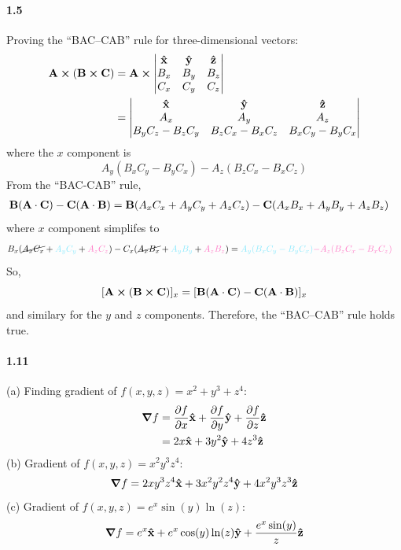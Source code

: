 \documentclass[../main.tex]{subfiles}
\begin{document}
\pagestyle{fancy}

\paragraph{1.5}
Proving the ``BAC--CAB'' rule for three-dimensional vectors:
\begin{align*}
    \vb{A} \cp (\vb{B} \cp \vb{C}) &= \vb{A} \cp
    \begin{vmatrix}
        \vu{x} & \vu{y} & \vu{z} \\
        B_x & B_y & B_z \\
        C_x & C_y & C_z
    \end{vmatrix} \\
    &= \begin{vmatrix}
        \vu{x} & \vu{y} & \vu{z} \\
        A_x & A_y & A_z \\
        B_y C_z - B_z C_y & B_z C_x - B_x C_z & B_x C_y - B_y C_x
    \end{vmatrix}
\end{align*}
where the $x$ component is 
\[A_y (B_x C_y - B_y C_x) - A_z (B_z C_x - B_x C_z)\]
From the ``BAC-CAB'' rule,
\begin{align*}
    \vb{B}(\vb{A} \cdot \vb{C}) - \vb{C}(\vb{A} \cdot \vb{B}) &=
        \vb{B} (A_x C_x + A_y C_y + A_z C_z) - \vb{C} (A_x B_x + A_y B_y + A_z B_z)
\end{align*}
where $x$ component simplifes to
\begin{align*}
    B_x (\cancel{A_x C_x} + \textcolor{draculacyan}{A_y C_y} + \textcolor{draculapink}{A_z C_z}) 
        - C_x (\cancel{A_x B_x}+ \textcolor{draculacyan}{A_y B_y} + \textcolor{draculapink}{A_z B_z}) &=
        \textcolor{draculacyan}{A_y (B_x C_y - B_y C_x)} \textcolor{draculapink}{- A_z (B_z C_x - B_x C_z)}
\end{align*}
So,
\[[\vb A \cross (\vb B \cross \vb C)]_x = [\vb B(\vb A \cdot \vb C) - \vb C ( \vb A \cdot \vb B)]_x\]
and similary for the $y$ and $z$ components. Therefore, the ``BAC--CAB'' rule holds true.

\newpage
\paragraph{1.11}
(a) Finding gradient of $f(x, y, z) = x^2 + y^3 + z^4$:
\begin{align*}
    \grad{f} &= \pdv{f}{x} \vu{x} + \pdv{f}{y} \vu{y} + \pdv{f}{z} \vu{z} \\
    &= 2x \vu{x} + 3y^2 \vu{y} + 4z^3 \vu{z}
\end{align*}
(b) Gradient of $f(x, y, z) = x^2y^3z^4$:
\begin{align*}
    \grad{f} = 2xy^3z^4 \vu{x} + 3x^2y^2z^4 \vu{y} + 4x^2y^3z^3 \vu{z}
\end{align*}
(c) Gradient of $f(x, y, z) = e^x \sin(y) \ln(z)$:
\begin{align*}
    \grad{f} = e^x \vu{x} + e^x \cos(y) \ln(z) \vu{y} + \frac{e^x \sin(y)}{z} \vu{z}
\end{align*}
\end{document}
